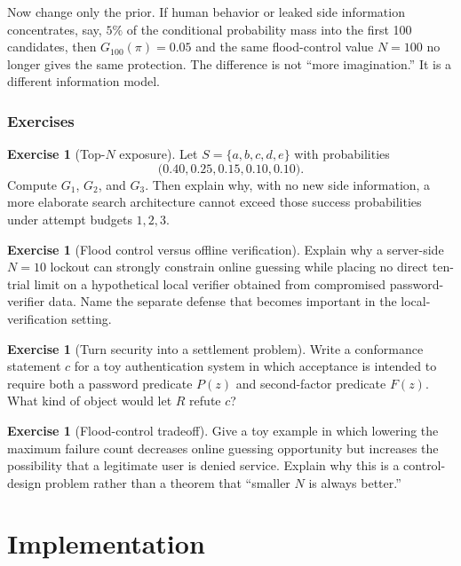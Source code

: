 \documentclass[11pt,openany]{book}
\theoremstyle{definition}
\newtheorem{exercise}[theorem]{Exercise}
\theoremstyle{remark}
\begin{document}
Now change only the prior. If human behavior or leaked side information concentrates, say, $5\%$ of the conditional probability mass into the first 100 candidates, then $G_{100}(\pi)=0.05$ and the same flood-control value $N=100$ no longer gives the same protection. The difference is not ``more imagination.'' It is a different information model.

\section{Exercises}
\begin{exercise}[Top-$N$ exposure]\label{ex:passwordtopn}
Let $S=\{a,b,c,d,e\}$ with probabilities
\[
\bigl(0.40,0.25,0.15,0.10,0.10\bigr).
\]
Compute $G_1$, $G_2$, and $G_3$. Then explain why, with no new side information, a more elaborate search architecture cannot exceed those success probabilities under attempt budgets $1,2,3$.
\end{exercise}

\begin{exercise}[Flood control versus offline verification]\label{ex:passwordoffline}
Explain why a server-side $N=10$ lockout can strongly constrain online guessing while placing no direct ten-trial limit on a hypothetical local verifier obtained from compromised password-verifier data. Name the separate defense that becomes important in the local-verification setting.
\end{exercise}

\begin{exercise}[Turn security into a settlement problem]\label{ex:passwordconformance}
Write a conformance statement $c$ for a toy authentication system in which acceptance is intended to require both a password predicate $P(z)$ and second-factor predicate $F(z)$. What kind of object would let $R$ refute $c$?
\end{exercise}

\begin{exercise}[Flood-control tradeoff]\label{ex:passworddos}
Give a toy example in which lowering the maximum failure count decreases online guessing opportunity but increases the possibility that a legitimate user is denied service. Explain why this is a control-design problem rather than a theorem that ``smaller $N$ is always better.''
\end{exercise}


\part{Implementation}
\end{document}
